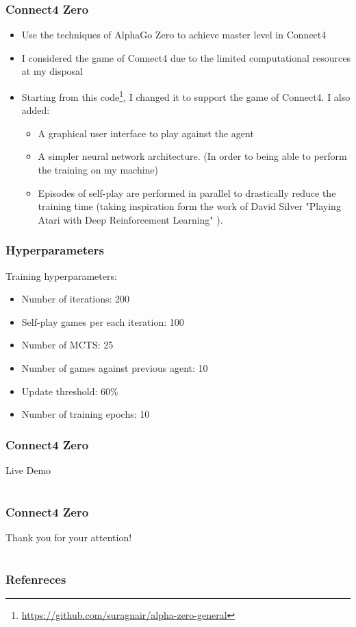 \documentclass[9pt]{beamer}
\begin{document}
\begin{frame}
	\frametitle{Connect4 Zero}

	\begin{itemize}
		\item Use the techniques of AlphaGo Zero \cite{silver2017mastering} to achieve master level in Connect4
		\item I considered the game of Connect4 due to the limited computational resources at my disposal
		\item Starting from this code\footnote{\url{https://github.com/suragnair/alpha-zero-general}}, I changed it to support the game of Connect4. I also added:
		\begin{itemize}
			\item A graphical user interface to play against the agent
			\item A simpler neural network architecture. (In order to being able to perform the training on my machine)
			\item Episodes of self-play are performed in parallel to drastically reduce the training time (taking inspiration form the work of David Silver "Playing Atari with Deep Reinforcement Learning" \cite{mnih2013atari}).

		\end{itemize}

	\end{itemize}

\end{frame}


\begin{frame}
	\frametitle{Hyperparameters}
	Training hyperparameters:

	\begin{itemize}
		\item Number of iterations: 200
		\item Self-play games per each iteration: 100
		\item Number of MCTS: 25
		\item Number of games against previous agent: 10
		\item Update threshold: 60\%
		\item Number of training epochs: 10
	\end{itemize}

\end{frame}


\begin{frame}
	\frametitle{Connect4 Zero}
	\Huge{\centerline{Live Demo}}
\end{frame}

\section{}
\begin{frame}
	\frametitle{Connect4 Zero}
	\Huge{\centerline{Thank you for your attention!}}
\end{frame}

\section{}
\begin{frame}[allowframebreaks]
	\frametitle{Refenreces}
	\printbibliography
\end{frame}

\end{document}
